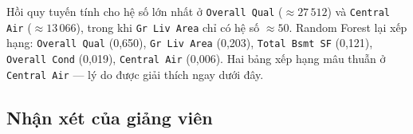 

Hồi quy tuyến tính cho hệ số lớn nhất ở \texttt{Overall Qual} ($\approx 27\,512$) và \texttt{Central Air} ($\approx 13\,066$), trong khi \texttt{Gr Liv Area} chỉ có hệ số $\approx 50$. Random Forest lại xếp hạng: \texttt{Overall Qual} (0,650), \texttt{Gr Liv Area} (0,203), \texttt{Total Bsmt SF} (0,121), \texttt{Overall Cond} (0,019), \texttt{Central Air} (0,006). Hai bảng xếp hạng mâu thuẫn ở \texttt{Central Air} --- lý do được giải thích ngay dưới đây.

\subsection{Nhận xét của giảng viên}

